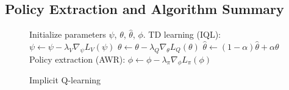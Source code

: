 \documentclass{article} %
\def\Ournamepref{Implicit\xspace}
\begin{document}
\subsection{Policy Extraction and Algorithm Summary}

\begin{figure}
    \begin{minipage}{0.35\textwidth}
        \begin{algorithm}[H]
            \caption{\Ournamepref Q-learning}
            \begin{algorithmic}
            \label{alg:iql}
                \State Initialize parameters $\psi$, $\theta$, $\hat{\theta}$, $\phi$.
                \State TD learning (IQL):
                \State $\psi \leftarrow \psi - \lambda_V \nabla_\psi L_V(\psi)$ 
                \State $\theta \leftarrow \theta - \lambda_Q \nabla_{\theta} L_Q(\theta)$
                \State $\hat{\theta} \leftarrow (1-\alpha)\hat{\theta} + \alpha\theta$
                \EndFor
                \State Policy extraction (AWR):
                \State $\phi \leftarrow \phi - \lambda_\pi \nabla_\phi L_\pi(\phi)$
                \EndFor
            \end{algorithmic}
        \end{algorithm}
    \end{minipage}
\end{figure}
\end{document}

